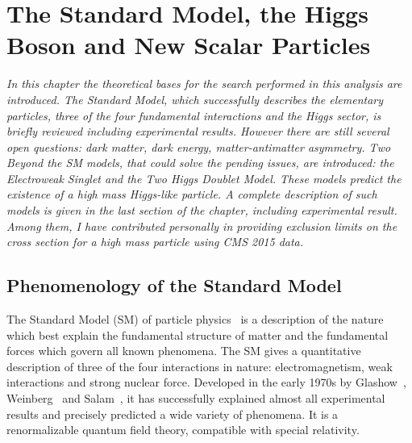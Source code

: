\chapter{The Standard Model, the Higgs Boson and New Scalar Particles}
\label{cap1}

\textit{In this chapter the theoretical bases for the search performed in this analysis are introduced. The Standard Model, which successfully 
describes the elementary particles, three of the four fundamental interactions and the Higgs sector, is briefly reviewed including experimental results. 
However there are still several open questions: dark matter, dark energy, matter-antimatter asymmetry. 
Two  Beyond the SM models, that could solve the  pending issues, are introduced: the Electroweak Singlet  and the Two Higgs Doublet Model.  
These models  predict the existence of a high mass Higgs-like particle. A complete description of such models is given in the last section of the chapter, including experimental result. Among them, I have contributed personally in providing exclusion limits on the cross section for a high mass particle using CMS 2015 data. }

\section{Phenomenology of the Standard Model}
The Standard Model (SM) of particle physics~\cite{Halzen:1984mc} is a description of the nature which best explain  the fundamental structure of matter and the fundamental forces which govern all known phenomena. The SM gives a quantitative description of three of the four interactions in nature: electromagnetism, weak interactions and  strong nuclear force.
Developed in the early 1970s by Glashow~\cite{GLASHOW1961579}, Weinberg~\cite{PhysRevLett.19.1264} and Salam~\cite{Salam:1968rm}, it has successfully explained almost
all experimental results and precisely predicted a wide variety of phenomena.
It is a renormalizable quantum field theory, compatible with special relativity.

